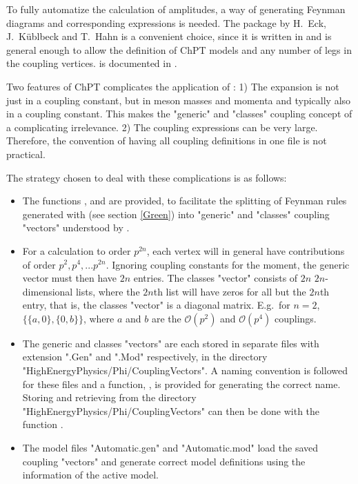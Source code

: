 To fully automatize the calculation of amplitudes, a way of generating Feynman diagrams and
corresponding expressions  is needed. The package \fa by H.~Eck, J.~K\"ublbeck and T.~Hahn
is a convenient choice, since it is written in \mma
and is general enough to allow the definition of ChPT models and any number of legs in the
coupling vertices. \fa is documented in \cite{Hahn:2000kx}.

Two features of ChPT complicates the application of \fa:
1) The expansion is not just in a coupling constant, but in meson masses and momenta and
typically also in a coupling constant.
This makes the "generic" and "classes" coupling concept of \fa a complicating irrelevance.
2) The coupling expressions can be very large. Therefore, the \fa convention of having all
coupling definitions in one file is not practical.

The strategy chosen to deal with these complications is as follows:
\begin{itemize}
\item The functions ,  and 
are provided, to facilitate the splitting of Feynman rules generated with
 (see section \ref{Green}) into "generic" and "classes" coupling "vectors"
understood by \fa.
\item For a calculation to order $p^{2 n}$, each vertex will in general have contributions of
order $p^2, p^4, ... p^{2 n}$. Ignoring coupling constants for the moment, the generic vector must
then have $2 n$ entries. The classes "vector" consists of $2 n$ $2 n$-dimensional lists,
where the $2 n$th list will have zeros for all but the $2 n$th entry, that is, the classes
"vector" is a diagonal matrix. E.g.~for $n=2$, $\{\{a,0\},\{0,b\}\}$, where $a$ and $b$ are the
$\mathcal{O}(p^2)$ and $\mathcal{O}(p^4)$ couplings.
\item The generic and classes "vectors" are each stored in separate files with extension
".Gen" and ".Mod" respectively, in the directory "HighEnergyPhysics/Phi/CouplingVectors".
A naming convention is followed for these files and a
function, , is provided for generating the correct name.
Storing and retrieving from the directory "HighEnergyPhysics/Phi/CouplingVectors" can then
be done with the function .
\item The \fa model files "Automatic.gen" and "Automatic.mod" load the saved coupling "vectors"
and generate correct \fa model definitions using the information of the active \fphi model.
\end{itemize}

